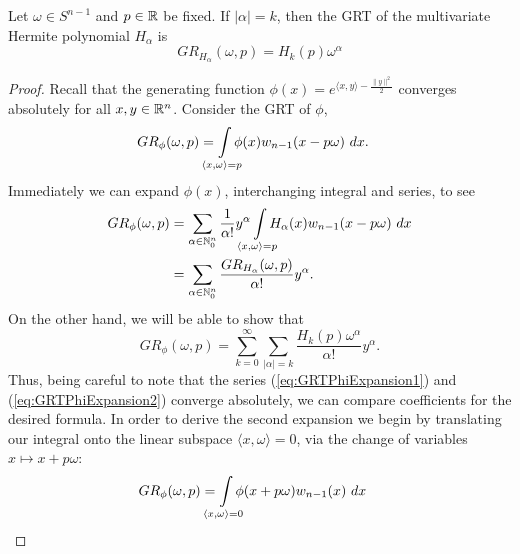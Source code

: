 \begin{proposition} \label{prop:GRTHermite}
  Let $\omega \in S^{n-1}$ and $p \in \mathbb{R}$ be fixed. If $|\alpha| = k$, then the GRT of the multivariate Hermite polynomial $H_\alpha$ is
  \begin{equation}\label{eq:GRH}
    GR_{H_\alpha}(\omega, p) = H_k(p)\omega^\alpha
  \end{equation}
\end{proposition}

\begin{proof}
  Recall that the generating function $\phi(x) = e^{\langle x, y\rangle - \frac{\|y\|^2}2}$ converges absolutely for all $x,y \in \mathbb{R}^n$. Consider the GRT of $\phi$,
  \begin{align*}
    GR_{\phi}(\omega, p) 
      &= \int\mclimits_{\langle x, \omega \rangle = p} \phi(x) w_{n-1}(x - p\omega)~dx.
  \end{align*}
  Immediately we can expand $\phi(x)$, interchanging integral and series, to see
  \begin{equation} \label{eq:GRTPhiExpansion1}
    \begin{split}
      GR_{\phi}(\omega, p)
        &= \sum_{\alpha \in \NN_0^n} \frac1{\alpha!} y^\alpha \int\mclimits_{\langle x, \omega\rangle = p} H_\alpha(x) w_{n-1}(x - p\omega)~dx
      \\&= \sum_{\alpha \in \NN_0^n} \frac{GR_{H_\alpha}(\omega, p)}{\alpha!} y^\alpha.
    \end{split}
  \end{equation}
  On the other hand, we will be able to show that
  \begin{equation} \label{eq:GRTPhiExpansion2}
    GR_{\phi}(\omega, p) 
    = \sum_{k = 0}^\infty \sum_{|\alpha| = k} \frac{H_k(p)\omega^\alpha}{\alpha!} y^\alpha.
  \end{equation}
  Thus, being careful to note that the series (\ref{eq:GRTPhiExpansion1}) and (\ref{eq:GRTPhiExpansion2}) converge absolutely, we can compare coefficients for the desired formula. In order to derive the second expansion we begin by translating our integral onto the linear subspace $\langle x, \omega\rangle = 0$, via the change of variables $x \mapsto x + p\omega$:
  \begin{equation}\label{eq:GRTPhiExpansion21}
    \begin{split}
      GR_{\phi}(\omega, p) 
        &= \int\mclimits_{\langle x, \omega\rangle = 0} \phi(x + p\omega) w_{n-1}(x) ~dx 

\end{split}
\end{equation}
\end{proof}

